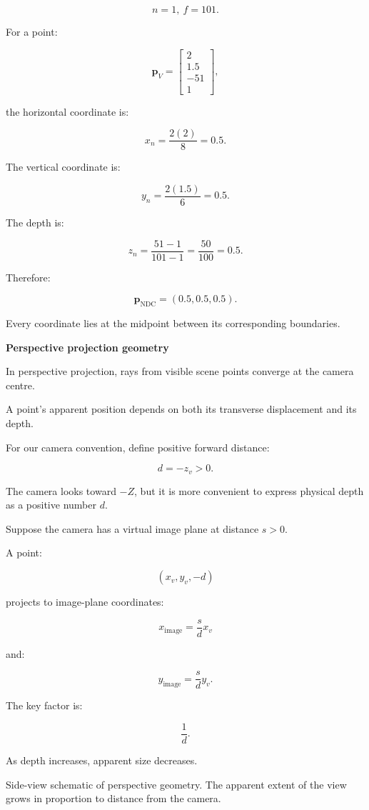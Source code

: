 \[
 n=1,\ f=101.
\]

For a point:

\[
 \mathbf p_V= \begin{bmatrix}2\\1.5\\-51\\1\end{bmatrix},
\]

the horizontal coordinate is:

\[
 x_n=\frac{2(2)}8=0.5.
\]

The vertical coordinate is:

\[
 y_n=\frac{2(1.5)}6=0.5.
\]

The depth is:

\[
 z_n=\frac{51-1}{101-1}=\frac{50}{100}=0.5.
\]

Therefore:

\[
 \boxed{ \mathbf p_{\mathrm{NDC}}=(0.5,0.5,0.5) }.
\]

Every coordinate lies at the midpoint between its corresponding boundaries.

\textbf{Perspective projection geometry}

In perspective projection, rays from visible scene points converge at the camera centre.

A point's apparent position depends on both its transverse displacement and its depth.

For our camera convention, define positive forward distance:

\[
 \boxed{d=-z_v>0}.
\]

The camera looks toward \(-Z\), but it is more convenient to express physical depth as a positive number \(d\).

Suppose the camera has a virtual image plane at distance \(s>0\).

A point:

\[
 (x_v,y_v,-d)
\]

projects to image-plane coordinates:

\[
 \boxed{ x_{\mathrm{image}}=\frac{s}{d}x_v }
\]

and:

\[
 \boxed{ y_{\mathrm{image}}=\frac{s}{d}y_v }.
\]

The key factor is:

\[
 \frac1d.
\]

As depth increases, apparent size decreases.

Side-view schematic of perspective geometry. The apparent extent of the view grows in proportion to distance from the camera.

